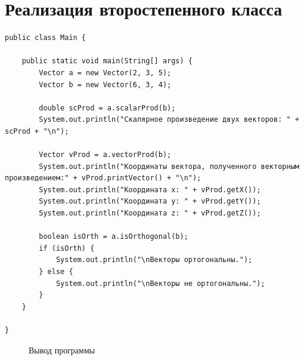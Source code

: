 \documentclass[a4paper, 14pt]{extarticle}
\begin{document}
\section{Реализация второстепенного класса}
{\scriptsize
\begin{verbatim}
public class Main {

    public static void main(String[] args) {
        Vector a = new Vector(2, 3, 5);
        Vector b = new Vector(6, 3, 4);

        double scProd = a.scalarProd(b);
        System.out.println("Скалярное произведение двух векторов: " + scProd + "\n");

        Vector vProd = a.vectorProd(b);
        System.out.println("Координаты вектора, полученного векторным произведением:" + vProd.printVector() + "\n");
        System.out.println("Координата x: " + vProd.getX());
        System.out.println("Координата y: " + vProd.getY());
        System.out.println("Координата z: " + vProd.getZ());

        boolean isOrth = a.isOrthogonal(b);
        if (isOrth) {
            System.out.println("\nВекторы ортогональны.");
        } else {
            System.out.println("\nВекторы не ортогональны.");
        }
    }

}
\end{verbatim}
}

\begin{figure}[h] 
\caption{Вывод программы} 
\label{fig:image} 
\end{figure}
\end{document}
